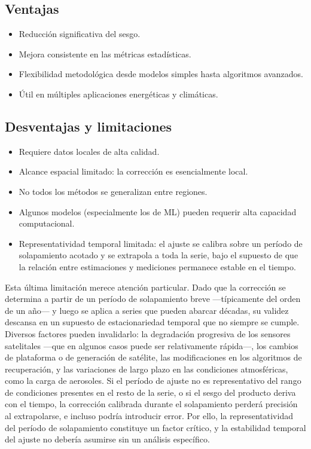 \subsection*{Ventajas}
\begin{itemize}
\item Reducción significativa del sesgo.
\item Mejora consistente en las métricas estadísticas.
\item Flexibilidad metodológica desde modelos simples hasta algoritmos avanzados.
\item Útil en múltiples aplicaciones energéticas y climáticas.
\end{itemize}


\subsection*{Desventajas y limitaciones}

\begin{itemize}
\item Requiere datos locales de alta calidad.
\item Alcance espacial limitado: la corrección es esencialmente local.
\item No todos los métodos se generalizan entre regiones.
\item Algunos modelos (especialmente los de ML) pueden requerir alta capacidad computacional.
\item Representatividad temporal limitada: el ajuste se calibra sobre un
período de solapamiento acotado y se extrapola a toda la serie, bajo el
supuesto de que la relación entre estimaciones y mediciones permanece
estable en el tiempo.
\end{itemize}

Esta última limitación merece atención particular. Dado que la corrección se determina a partir de un período de solapamiento breve —típicamente del orden de un año— y luego se aplica a series que pueden abarcar décadas, su validez descansa en un supuesto de estacionariedad temporal que no siempre se cumple.
Diversos factores pueden invalidarlo: la degradación progresiva de los
sensores satelitales —que en algunos casos puede ser relativamente rápida—,
los cambios de plataforma o de generación de satélite, las modificaciones en los algoritmos de recuperación, y las variaciones de largo plazo en las
condiciones atmosféricas, como la carga de aerosoles. Si el período de ajuste no es representativo del rango de condiciones presentes en el resto de la serie, o si el sesgo del producto deriva con el tiempo, la corrección
calibrada durante el solapamiento perderá precisión al extrapolarse, e
incluso podría introducir error. Por ello, la representatividad del período de solapamiento constituye un factor crítico, y la estabilidad temporal del
ajuste no debería asumirse sin un análisis específico.


